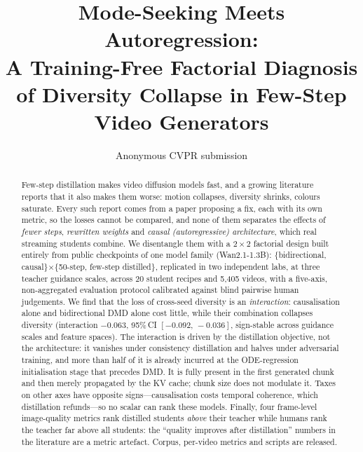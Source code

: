 \documentclass[10pt,twocolumn,letterpaper]{article}
\title{Mode-Seeking Meets Autoregression:\\A Training-Free Factorial Diagnosis of Diversity Collapse in Few-Step Video Generators}
\author{Anonymous CVPR submission}
\newcommand{\ci}[2]{[#1,\,#2]}
\begin{document}
\maketitle

\begin{abstract}
Few-step distillation makes video diffusion models fast, and a growing literature reports that it also makes them worse: motion collapses, diversity shrinks, colours saturate. Every such report comes from a paper proposing a fix, each with its own metric, so the losses cannot be compared, and none of them separates the effects of \emph{fewer steps}, \emph{rewritten weights} and \emph{causal (autoregressive) architecture}, which real streaming students combine. We disentangle them with a $2{\times}2$ factorial design built entirely from public checkpoints of one model family (Wan2.1-1.3B): \{bidirectional, causal\}$\times$\{50-step, few-step distilled\}, replicated in two independent labs, at three teacher guidance scales, across 20 student recipes and 5{,}405 videos, with a five-axis, non-aggregated evaluation protocol calibrated against blind pairwise human judgements. We find that the loss of cross-seed diversity is an \emph{interaction}: causalisation alone and bidirectional DMD alone cost little, while their combination collapses diversity (interaction $-0.063$, 95\%\,CI $\ci{-0.092}{-0.036}$, sign-stable across guidance scales and feature spaces). The interaction is driven by the distillation objective, not the architecture: it vanishes under consistency distillation and halves under adversarial training, and more than half of it is already incurred at the ODE-regression initialisation stage that precedes DMD. It is fully present in the first generated chunk and then merely propagated by the KV cache; chunk size does not modulate it. Taxes on other axes have opposite signs---causalisation costs temporal coherence, which distillation refunds---so no scalar can rank these models. Finally, four frame-level image-quality metrics rank distilled students \emph{above} their teacher while humans rank the teacher far above all students: the ``quality improves after distillation'' numbers in the literature are a metric artefact. Corpus, per-video metrics and scripts are released.
\end{abstract}
\end{document}
